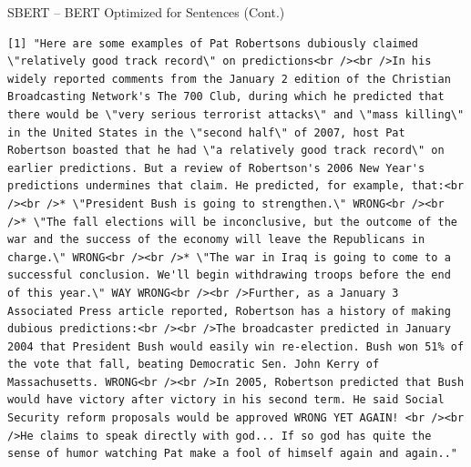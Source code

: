 \documentclass[
  ignorenonframetext,
  aspectratio=169]{beamer}
\newenvironment{Shaded}{\begin{snugshade}}{\end{snugshade}}
\newcommand{\AttributeTok}[1]{\textcolor[rgb]{0.13,0.29,0.53}{#1}}
\newcommand{\CommentTok}[1]{\textcolor[rgb]{0.56,0.35,0.01}{\textit{#1}}}
\newcommand{\DecValTok}[1]{\textcolor[rgb]{0.00,0.00,0.81}{#1}}
\newcommand{\FunctionTok}[1]{\textcolor[rgb]{0.13,0.29,0.53}{\textbf{#1}}}
\newcommand{\NormalTok}[1]{#1}
\newcommand{\OtherTok}[1]{\textcolor[rgb]{0.56,0.35,0.01}{#1}}
\newcommand{\SpecialCharTok}[1]{\textcolor[rgb]{0.81,0.36,0.00}{\textbf{#1}}}
\begin{document}
\begin{frame}[fragile]{SBERT -- BERT Optimized for Sentences (Cont.)}
\label{sbert-bert-optimized-for-sentences-cont.-3}
\scriptsize

\begin{Shaded}
\end{Shaded}

\begin{verbatim}
[1] "Here are some examples of Pat Robertsons dubiously claimed \"relatively good track record\" on predictions<br /><br />In his widely reported comments from the January 2 edition of the Christian Broadcasting Network's The 700 Club, during which he predicted that there would be \"very serious terrorist attacks\" and \"mass killing\" in the United States in the \"second half\" of 2007, host Pat Robertson boasted that he had \"a relatively good track record\" on earlier predictions. But a review of Robertson's 2006 New Year's predictions undermines that claim. He predicted, for example, that:<br /><br />* \"President Bush is going to strengthen.\" WRONG<br /><br />* \"The fall elections will be inconclusive, but the outcome of the war and the success of the economy will leave the Republicans in charge.\" WRONG<br /><br />* \"The war in Iraq is going to come to a successful conclusion. We'll begin withdrawing troops before the end of this year.\" WAY WRONG<br /><br />Further, as a January 3 Associated Press article reported, Robertson has a history of making dubious predictions:<br /><br />The broadcaster predicted in January 2004 that President Bush would easily win re-election. Bush won 51% of the vote that fall, beating Democratic Sen. John Kerry of Massachusetts. WRONG<br /><br />In 2005, Robertson predicted that Bush would have victory after victory in his second term. He said Social Security reform proposals would be approved WRONG YET AGAIN! <br /><br />He claims to speak directly with god... If so god has quite the sense of humor watching Pat make a fool of himself again and again.."
\end{verbatim}


\end{frame}
\end{document}

